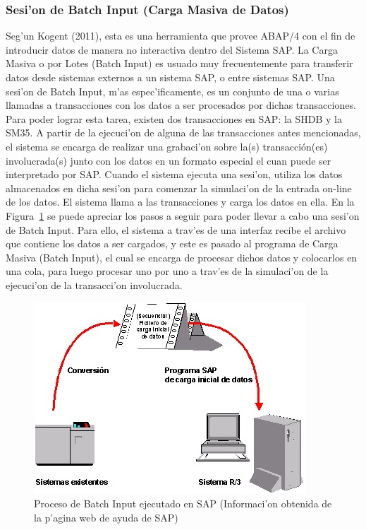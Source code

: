\subsubsection{Sesi'on de Batch Input (Carga Masiva de Datos)}
	Seg'un Kogent (2011), esta es una herramienta que provee ABAP/4 con el fin de introducir datos de manera no interactiva dentro del Sistema SAP. La Carga Masiva o por Lotes (Batch Input) es usuado muy frecuentemente para transferir datos desde sistemas externos a un sistema SAP, o entre sistemas SAP. Una sesi'on de Batch Input, m'as espec'ificamente, es un conjunto de una o varias llamadas a transacciones con los datos a ser procesados por dichas transacciones.  
\newline
\newline
	Para poder lograr esta tarea, existen dos transacciones en SAP: la SHDB y la SM35. A partir de la ejecuci'on de alguna de las transacciones antes mencionadas, el sistema se encarga de realizar una grabaci'on sobre la(s) transacción(es) involucrada(s) junto con los datos en un formato especial el cuan puede ser interpretado por SAP. Cuando el sistema ejecuta una sesi'on, utiliza los datos almacenados en dicha sesi'on para comenzar la simulaci'on de la entrada on-line de los datos. El sistema llama a las transacciones y carga los datos en ella. En la Figura~\ref{fig:process}  se puede apreciar los pasos a seguir para poder llevar a cabo una sesi'on de Batch Input. Para ello, el sistema a trav'es de una interfaz recibe el archivo que contiene los datos a ser cargados, y este es pasado al programa de Carga Masiva (Batch Input), el cual se encarga de procesar dichos datos y colocarlos en una cola, para luego procesar uno por uno a trav'es de la simulaci'on de la ejecuci'on de la transacci'on involucrada. 
	
\begin{figure}[H]
\centering
\includegraphics[scale=1.25,type=jpg,ext=.jpg,read=.jpg]{figures/batchinput}
\caption{Proceso de Batch Input ejecutado en SAP (Informaci'on obtenida de la p'agina web de ayuda de SAP)}
\label{fig:process}
\end{figure}


